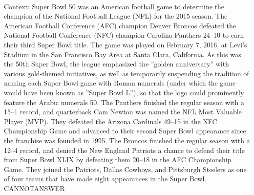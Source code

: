 \documentclass[11pt,a4paper, onecolumn]{article}
\begin{document}
\\ Context: Super Bowl 50 was an American football game to determine the champion of the National Football League (NFL) for the 2015 season. The American Football Conference (AFC) champion Denver Broncos defeated the National Football Conference (NFC) champion Carolina Panthers 24–10 to earn their third Super Bowl title. The game was played on February 7, 2016, at Levi's Stadium in the San Francisco Bay Area at Santa Clara, California. As this was the 50th Super Bowl, the league emphasized the ''golden anniversary'' with various gold-themed initiatives, as well as temporarily suspending the tradition of naming each Super Bowl game with Roman numerals (under which the game would have been known as ''Super Bowl L''), so that the logo could prominently feature the Arabic numerals 50. The Panthers finished the regular season with a 15–1 record, and quarterback Cam Newton was named the NFL Most Valuable Player (MVP). They defeated the Arizona Cardinals 49–15 in the NFC Championship Game and advanced to their second Super Bowl appearance since the franchise was founded in 1995. The Broncos finished the regular season with a 12–4 record, and denied the New England Patriots a chance to defend their title from Super Bowl XLIX by defeating them 20–18 in the AFC Championship Game. They joined the Patriots, Dallas Cowboys, and Pittsburgh Steelers as one of four teams that have made eight appearances in the Super Bowl. CANNOTANSWER
\end{document}
